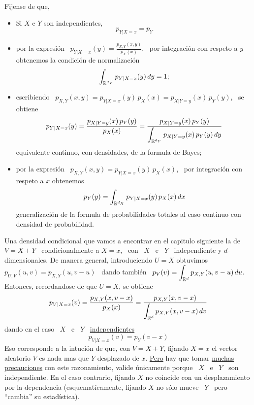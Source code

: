 {Fijense de  que,
%
\begin{itemize}
\item Si $X$ e $Y$ son independientes,
  \[
  p_{Y|X=x} = p_Y
  \]
%
\item por  la expresi\'on \ $p_{Y|X=x}(y) =  \frac{p_{X,Y}(x,y)}{p_X(x)}$, \ por
  integraci\'on con respeto a $y$ obtenemos la condici\'on de normalizaci\'on
  \[
  \int_{\mathbb{R}^{d_Y}} p_{Y|X=x}(y) \, dy = 1;
  \]
%
\item escribiendo  \ $p_{X,Y}(x,y)  = p_{Y|X=x}(y) \,  p_X(x) =  p_{X|Y=y}(x) \,
  p_Y(y)$, \ se obtiene
  \[
  p_{Y|X=x}(y)   =  \frac{p_{X|Y=y}(x) \,   p_Y(y)}{p_X(x)}   =  \frac{p_{X|Y=y}(x)
    \, p_Y(y)}{\displaystyle \int_{\mathbb{R}^{d_Y}} p_{X|Y=y}(x) \, p_Y(y) \, dy}
  \]
  equivalente continuo, con densidades, de la formula de Bayes;
%
\item  por la  expresi\'on  \ $p_{X,Y}(x,y)  =  p_{Y|X=x}(y) \,  p_X(x)$, \  por
  integraci\'on con respeto a $x$ obtenemos
  \[
  p_Y(y) = \int_{\mathbb{R}^{d_X}} p_{Y|X=x}(y) \, p_X(x) \, dx
  \]
  generalizaci\'on de la formula de  probabilidades totales al caso continuo con
  densidad de probabilidad.
\end{itemize}

Una densidad condicional que vamos a  encontrar en el capitulo siguiente la de \
$V = X + Y$ \ condicionalmente a $X =  x$, \ con \ $X$ \ e \ $Y$ \ independiente
y  $d$-dimensionales. De  manera  general,  introduciendo $U  =  X$ obtuvimos  \
$p_{U,V}(u,v)  = p_{X,Y}(u,v-u)$  \ dando  tambi\'en \  $\displaystyle  p_V(v) =
\int_{\mathbb{R}^d} p_{X,Y}(u,v-u) \, du$. Entonces,  recordandose de que $U = X$, se
obtiene
%
\[
p_{V|X=x}(v)             =            \frac{p_{X,Y}(x,v-x)}{p_X(x)}            =
\frac{p_{X,Y}(x,v-x)}{\displaystyle \int_{\mathbb{R}^d} p_{X,Y}(x,v-x) \, dv}
\]
%
dando en el caso \ $X$ \ e \ $Y$ \ \underline{independientes}
%
\[
p_{V|X=x}(v) = p_Y(v-x)
\]
%
Eso corresponde  a la intuci\'on  de que, con $V  = X +  Y$, fijando $X =  x$ el
vector aleatorio $V$ es nada mas que $Y$ desplazado de $x$. \underline{Pero} hay
que  tomar   \underline{muchas  precauciones}  con   este  razonamiento,  valide
\'unicamente porque \ $X$ \ e \  $Y$ \ son independiente.  En el caso contrario,
fijando   $X$   no  coincide   con   un   desplazamiento   por  la   dependencia
(esquemat\'icamente,  fijando $X$ no  s\'olo mueve  \ $Y$  \ pero  ``cambia'' su
estad\'istica).

  }


